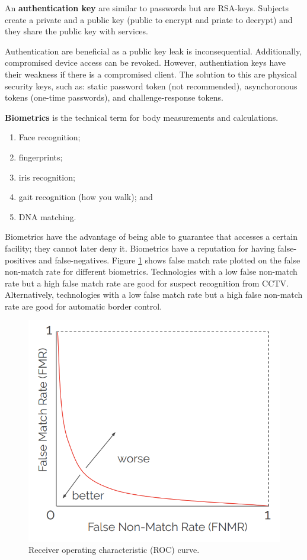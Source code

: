 \begin{definition}
    An \textbf{authentication key} are similar to passwords but are RSA-keys. Subjects create a private and a public key (public to encrypt and priate to decrypt) and they share the public key with services. 
\end{definition}

Authentication are beneficial as a public key leak is inconsequential. Additionally, compromised device access can be revoked. However, authentiation keys have their weakness if there is a compromised client. The solution to this are physical security keys, such as: static password token (not recommended), asynchoronous tokens (one-time passwords), and challenge-response tokens.

\begin{definition}[Biometrics]
    \textbf{Biometrics} is the technical term for body measurements and calculations.
\end{definition}

\begin{example}[Biometrics]
    \begin{enumerate}
        \item Face recognition;
        \item fingerprints;
        \item iris recognition;
        \item gait recognition (how you walk); and
        \item DNA matching.
    \end{enumerate}
\end{example}

Biometrics have the advantage of being able to guarantee that accesses a certain facility; they cannot later deny it. 
Biometrics have a reputation for having false-positives and false-negatives. 
Figure \ref{fig:false-match-rate} shows false match rate plotted on the false non-match rate for different biometrics. 
Technologies with a low false non-match rate but a high false match rate are good for suspect recognition from CCTV.
Alternatively, technologies with a low false match rate but a high false non-match rate are good for automatic border control. 

\begin{figure}
    \centering
    \includegraphics[width=0.6\linewidth]{images/false-match-rate.png}
    \caption{Receiver operating characteristic (ROC) curve.}
    \label{fig:false-match-rate}
\end{figure}

